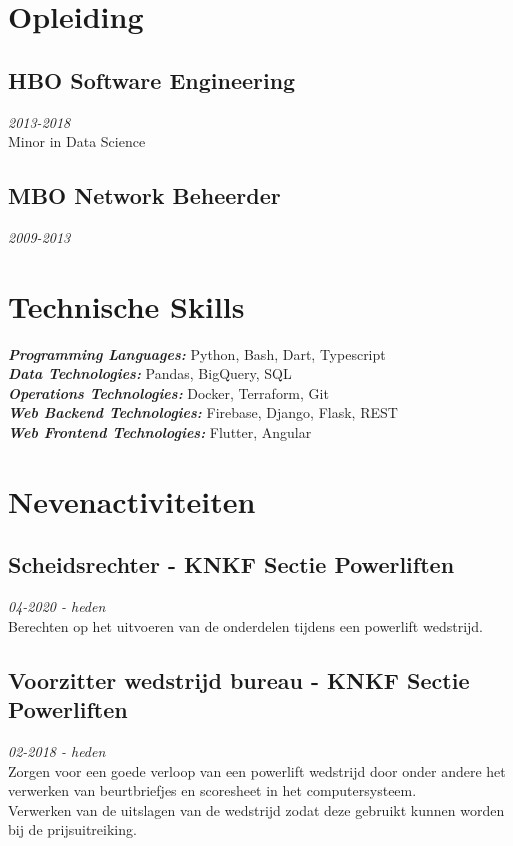 \documentclass{article}
\begin{document}
\section{Opleiding}
\subsection{HBO Software Engineering}\hfill {\em 2013-2018} \\
Minor in Data Science
\subsection{MBO Network Beheerder}\hfill {\em 2009-2013} \\

\section{Technische Skills}
{\sl \textbf{Programming Languages:}} Python, Bash, Dart, Typescript \\
{\sl \textbf{Data Technologies:}} Pandas, BigQuery, SQL \\
{\sl \textbf{Operations Technologies:}} Docker, Terraform, Git \\
{\sl \textbf{Web Backend Technologies:}} Firebase, Django, Flask, REST \\
{\sl \textbf{Web Frontend Technologies:}} Flutter, Angular \\

\section{Nevenactiviteiten}
\subsection{Scheidsrechter - KNKF Sectie Powerliften} \hfill {\em 04-2020 - heden} \\
Berechten op het uitvoeren van de onderdelen tijdens een powerlift wedstrijd.

\subsection{Voorzitter wedstrijd bureau - KNKF Sectie Powerliften} \hfill {\em 02-2018 - heden} \\
Zorgen voor een goede verloop van een powerlift wedstrijd door onder andere het verwerken van beurtbriefjes en scoresheet in het computersysteem. \\
Verwerken van de uitslagen van de wedstrijd zodat deze gebruikt kunnen worden bij de prijsuitreiking.
\end{document}
